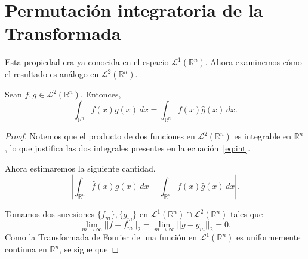 \section{Permutación integratoria de la Transformada}
Esta propiedad era ya conocida en el espacio $\mathscr{L}^1(\mathbb{R}^n)$. Ahora examinemos cómo el resultado es análogo en $\mathscr{L}^2(\mathbb{R}^n)$.
\begin{teorema}
    Sean $f,g \in \mathscr{L}^2(\mathbb{R}^n)$. Entonces,
    \begin{equation}\label{eq:int}
        \int_{\mathbb{R}^n} \widehat{f}(x)g(x) \, dx =  \int_{\mathbb{R}^n} f(x) \widehat{g}(x) \, dx.
    \end{equation}
\end{teorema}
\begin{proof}

\noindent 

\noindent Notemos que el producto de dos funciones en $\mathscr{L}^2(\mathbb{R}^n)$ es integrable en $\mathbb{R}^n$, lo que justifica las dos integrales presentes en la ecuación~\eqref{eq:int}. 

\noindent Ahora estimaremos la siguiente cantidad.
\begin{equation}
    \left| \int_{\mathbb{R}^n}\widehat{f}(x)g(x) \, dx - \int_{\mathbb{R}^n}f(x)\widehat{g}(x) \, dx\right|.
\end{equation}

\noindent Tomamos dos sucesiones $\{f_m\},\{g_m\}$ en  $\mathscr{L}^1(\mathbb{R}^n)\cap\mathscr{L}^2(\mathbb{R}^n)$ tales que
\begin{equation}
    \lim_{m \rightarrow \infty}||f-f_m||_2 = \lim_{m \rightarrow \infty}||g-g_m||_2 =0.
\end{equation}
Como la Transformada de Fourier de una función en $\mathscr{L}^1(\mathbb{R}^n)$ es uniformemente continua en $\mathbb{R}^n$, se sigue que


\end{proof}
